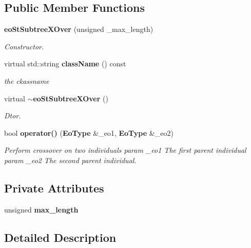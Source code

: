 \subsection*{Public Member Functions}
\begin{CompactItemize}
\item 
{\bf eo\-St\-Subtree\-XOver} (unsigned \_\-max\_\-length)
\begin{CompactList}\small\item\em Constructor. \item\end{CompactList}\item 
virtual std::string {\bf class\-Name} () const \label{classeo_st_subtree_x_over_a1}

\begin{CompactList}\small\item\em the ckassname \item\end{CompactList}\item 
virtual {\bf $\sim$eo\-St\-Subtree\-XOver} ()\label{classeo_st_subtree_x_over_a2}

\begin{CompactList}\small\item\em Dtor. \item\end{CompactList}\item 
bool {\bf operator()} ({\bf Eo\-Type} \&\_\-eo1, {\bf Eo\-Type} \&\_\-eo2)\label{classeo_st_subtree_x_over_a3}

\begin{CompactList}\small\item\em Perform crossover on two individuals param \_\-eo1 The first parent individual param \_\-eo2 The second parent individual. \item\end{CompactList}\end{CompactItemize}
\subsection*{Private Attributes}
\begin{CompactItemize}
\item 
unsigned {\bf max\_\-length}\label{classeo_st_subtree_x_over_r0}

\end{CompactItemize}


\subsection{Detailed Description}
